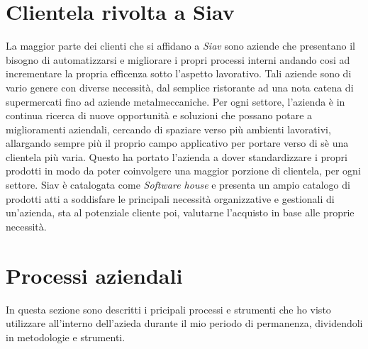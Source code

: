 \section{Clientela rivolta a Siav}
La maggior parte dei clienti che si affidano a \textit{Siav} sono aziende che presentano il bisogno di automatizzarsi e migliorare i propri processi interni andando cosi ad incrementare la propria efficenza sotto l'aspetto lavorativo. Tali aziende sono di vario genere con diverse necessità, dal semplice ristorante ad una nota catena di supermercati fino ad aziende metalmeccaniche. Per ogni settore, l'azienda è in continua ricerca di nuove opportunità e soluzioni che possano potare a miglioramenti aziendali, cercando di spaziare verso più ambienti lavorativi, allargando sempre più il proprio campo applicativo per portare verso di sè una clientela più varia. Questo ha portato l'azienda a dover standardizzare i propri prodotti in modo da poter coinvolgere una maggior porzione di clientela, per ogni settore.
Siav è catalogata come \textit{Software house} e presenta un ampio catalogo di prodotti atti a soddisfare le principali necessità organizzative e gestionali di un'azienda, sta al potenziale cliente poi, valutarne l'acquisto in base alle proprie necessità.
\newpage
\section {Processi aziendali}
In questa sezione sono descritti i pricipali processi e strumenti che ho visto utilizzare all'interno dell'azieda durante il mio periodo di permanenza, dividendoli in metodologie e strumenti.
